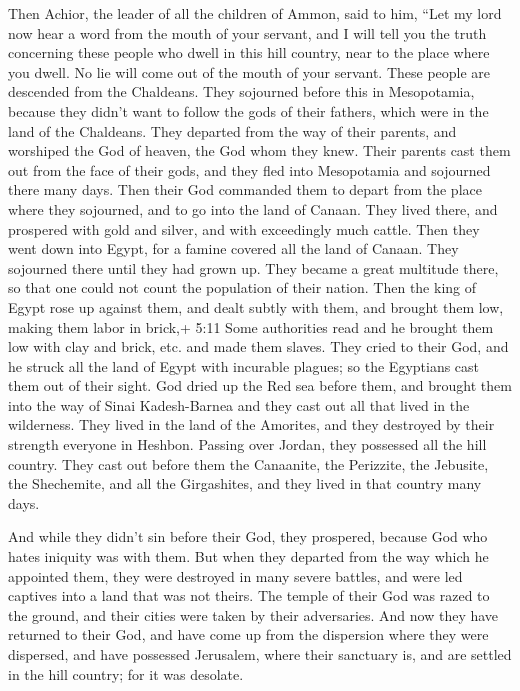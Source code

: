  Then Achior, the leader of all the children of Ammon, said
to him, ``Let my lord now hear a word from the mouth of your servant,
and I will tell you the truth concerning these people who dwell in this
hill country, near to the place where you dwell. No lie will come out of
the mouth of your servant.  These people are descended from
the Chaldeans.  They sojourned before this in Mesopotamia,
because they didn't want to follow the gods of their fathers, which were
in the land of the Chaldeans.  They departed from the way of
their parents, and worshiped the God of heaven, the God whom they knew.
Their parents cast them out from the face of their gods, and they fled
into Mesopotamia and sojourned there many days.  Then their
God commanded them to depart from the place where they sojourned, and to
go into the land of Canaan. They lived there, and prospered with gold
and silver, and with exceedingly much cattle.  Then they
went down into Egypt, for a famine covered all the land of Canaan. They
sojourned there until they had grown up. They became a great multitude
there, so that one could not count the population of their nation.
 Then the king of Egypt rose up against them, and dealt
subtly with them, and brought them low, making them labor in brick,+
5:11 Some authorities read and he brought them low with clay and brick,
etc. and made them slaves.  They cried to their God, and he
struck all the land of Egypt with incurable plagues; so the Egyptians
cast them out of their sight.  God dried up the Red sea
before them,  and brought them into the way of Sinai
Kadesh-Barnea and they cast out all that lived in the wilderness.
 They lived in the land of the Amorites, and they destroyed
by their strength everyone in Heshbon. Passing over Jordan, they
possessed all the hill country.  They cast out before them
the Canaanite, the Perizzite, the Jebusite, the Shechemite, and all the
Girgashites, and they lived in that country many days.

 And while they didn't sin before their God, they
prospered, because God who hates iniquity was with them. 
But when they departed from the way which he appointed them, they were
destroyed in many severe battles, and were led captives into a land that
was not theirs. The temple of their God was razed to the ground, and
their cities were taken by their adversaries.  And now they
have returned to their God, and have come up from the dispersion where
they were dispersed, and have possessed Jerusalem, where their sanctuary
is, and are settled in the hill country; for it was desolate.

